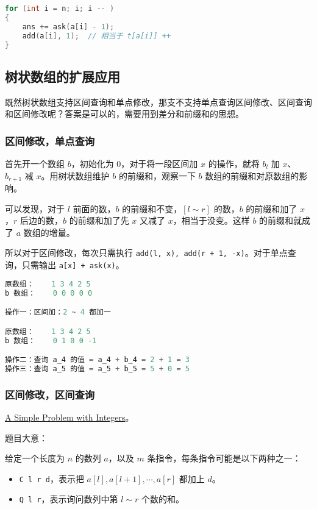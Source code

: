 \begin{lstlisting}[language=cpp]
for (int i = n; i; i -- )
{
    ans += ask(a[i] - 1);
    add(a[i], 1);  // 相当于 t[a[i]] ++ 
}
\end{lstlisting}

\subsection{树状数组的扩展应用}

既然树状数组支持区间查询和单点修改，那支不支持单点查询区间修改、区间查询和区间修改呢？答案是可以的，需要用到差分和前缀和的思想。

\subsubsection{区间修改，单点查询}

首先开一个数组 $b$，初始化为 $0$，对于将一段区间加 $x$ 的操作，就将 $b_l$ 加 $x$、$b_{r + 1}$ 减 $x$。用树状数组维护 $b$ 的前缀和，观察一下 $b$ 数组的前缀和对原数组的影响。

可以发现，对于 $l$ 前面的数，$b$ 的前缀和不变，$[l \sim r]$ 的数，$b$ 的前缀和加了 $x$，$r$ 后边的数，$b$ 的前缀和加了先 $x$ 又减了 $x$，相当于没变。这样 $b$ 的前缀和就成了 $a$ 数组的增量。

所以对于区间修改，每次只需执行 \verb|add(l, x), add(r + 1, -x)|。对于单点查询，只需输出 \verb|a[x] + ask(x)|。

\begin{lstlisting}[language=cpp]
原数组：    1 3 4 2 5
b 数组：    0 0 0 0 0

操作一：区间加：2 ~ 4 都加一

原数组：    1 3 4 2 5
b 数组：    0 1 0 0 -1

操作二：查询 a_4 的值 = a_4 + b_4 = 2 + 1 = 3
操作三：查询 a_5 的值 = a_5 + b_5 = 5 + 0 = 5
\end{lstlisting}

\subsubsection{区间修改，区间查询}
\href{http://poj.org/problem?id=3468}{A Simple Problem with Integers}。

题目大意：

给定一个长度为 $n$ 的数列 $a$，以及 $m$ 条指令，每条指令可能是以下两种之一：

\begin{itemize}
\item \verb|C l r d|，表示把 $a[l],a[l+1], \cdots , a[r]$ 都加上 $d$。
\item \verb|Q l r|，表示询问数列中第 $l \sim r$ 个数的和。
\end{itemize}

